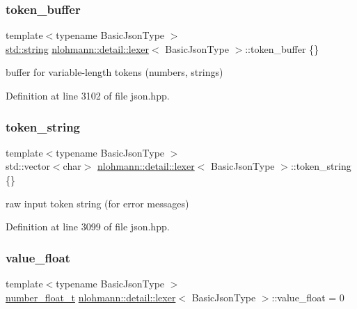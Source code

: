 \subsubsection{\texorpdfstring{token\+\_\+buffer}{token\_buffer}}
{\footnotesize\ttfamily template$<$typename Basic\+Json\+Type $>$ \\
\hyperlink{namespacenlohmann_1_1detail_a1ed8fc6239da25abcaf681d30ace4985ab45cffe084dd3d20d928bee85e7b0f21}{std\+::string} \hyperlink{classnlohmann_1_1detail_1_1lexer}{nlohmann\+::detail\+::lexer}$<$ Basic\+Json\+Type $>$\+::token\+\_\+buffer \{\}\hspace{0.3cm}{\ttfamily [private]}}



buffer for variable-\/length tokens (numbers, strings) 



Definition at line 3102 of file json.\+hpp.

\mbox{\label{classnlohmann_1_1detail_1_1lexer_ad2960e3d54af8fb8d572a8f6f7731d62}} 
\subsubsection{\texorpdfstring{token\+\_\+string}{token\_string}}
{\footnotesize\ttfamily template$<$typename Basic\+Json\+Type $>$ \\
std\+::vector$<$char$>$ \hyperlink{classnlohmann_1_1detail_1_1lexer}{nlohmann\+::detail\+::lexer}$<$ Basic\+Json\+Type $>$\+::token\+\_\+string \{\}\hspace{0.3cm}{\ttfamily [private]}}



raw input token string (for error messages) 



Definition at line 3099 of file json.\+hpp.

\mbox{\label{classnlohmann_1_1detail_1_1lexer_a861ce804da2d257ee373d1e0b55780e1}} 
\subsubsection{\texorpdfstring{value\+\_\+float}{value\_float}}
{\footnotesize\ttfamily template$<$typename Basic\+Json\+Type $>$ \\
\hyperlink{classnlohmann_1_1detail_1_1lexer_aa7f9e7b2bcd311fb86e2da43761a6619}{number\+\_\+float\+\_\+t} \hyperlink{classnlohmann_1_1detail_1_1lexer}{nlohmann\+::detail\+::lexer}$<$ Basic\+Json\+Type $>$\+::value\+\_\+float = 0\hspace{0.3cm}{\ttfamily [private]}}



